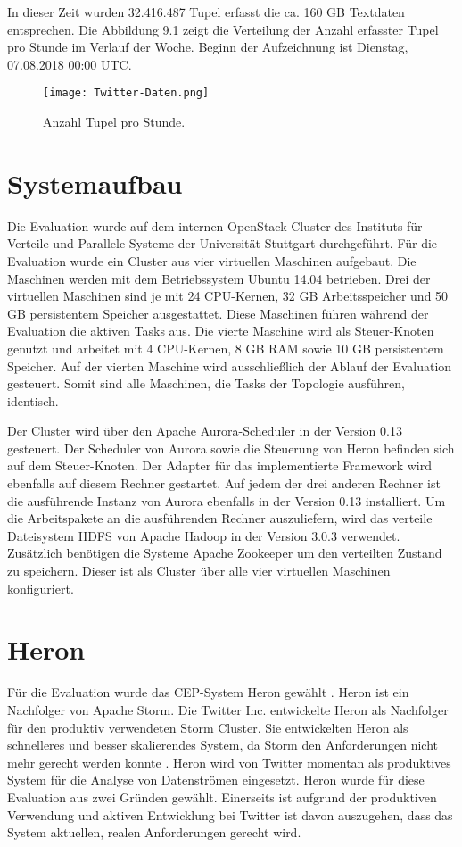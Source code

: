 In dieser Zeit wurden 32.416.487 Tupel erfasst die ca. 160 GB Textdaten entsprechen.
Die Abbildung 9.1 zeigt die Verteilung der Anzahl erfasster Tupel pro Stunde im Verlauf der Woche.
Beginn der Aufzeichnung ist Dienstag, 07.08.2018 00:00 UTC.


\begin{figure}
 \texttt{[image: Twitter-Daten.png]}
 \caption{Anzahl Tupel pro Stunde.}
\end{figure}

\section{Systemaufbau}
Die Evaluation wurde auf dem internen OpenStack-Cluster des Instituts für Verteile und Parallele Systeme der Universität Stuttgart durchgeführt.
Für die Evaluation wurde ein Cluster aus vier virtuellen Maschinen aufgebaut.
Die Maschinen werden mit dem Betriebssystem Ubuntu 14.04 betrieben.
Drei der virtuellen Maschinen sind je mit 24 CPU-Kernen, 32 GB Arbeitsspeicher und 50 GB persistentem Speicher ausgestattet.
Diese Maschinen führen während der Evaluation die aktiven Tasks aus.
Die vierte Maschine wird als Steuer-Knoten genutzt und arbeitet mit 4 CPU-Kernen, 8 GB RAM sowie 10 GB persistentem Speicher.
Auf der vierten Maschine wird ausschließlich der Ablauf der Evaluation gesteuert.
Somit sind alle Maschinen, die Tasks der Topologie ausführen, identisch.

Der Cluster wird über den Apache Aurora-Scheduler in der Version 0.13 gesteuert.
Der Scheduler von Aurora sowie die Steuerung von Heron befinden sich auf dem Steuer-Knoten.
Der Adapter für das implementierte Framework wird ebenfalls auf diesem Rechner gestartet.
Auf jedem der drei anderen Rechner ist die ausführende Instanz von Aurora ebenfalls in der Version 0.13 installiert.
Um die Arbeitspakete an die ausführenden Rechner auszuliefern, wird das verteile Dateisystem HDFS von Apache Hadoop in der Version 3.0.3 verwendet.
Zusätzlich benötigen die Systeme Apache Zookeeper um den verteilten Zustand zu speichern.
Dieser ist als Cluster über alle vier virtuellen Maschinen konfiguriert.

\section{Heron}
Für die Evaluation wurde das CEP-System Heron gewählt \cite{kulkarni_twitter_2015}.
Heron ist ein Nachfolger von Apache Storm.
Die Twitter Inc. entwickelte Heron als Nachfolger für den produktiv verwendeten Storm Cluster.
Sie entwickelten Heron als schnelleres und besser skalierendes System, da Storm den Anforderungen nicht mehr gerecht werden konnte \cite{kulkarni_twitter_2015}.
Heron wird von Twitter momentan als produktives System für die Analyse von Datenströmen eingesetzt.
Heron wurde für diese Evaluation aus zwei Gründen gewählt.
Einerseits ist aufgrund der produktiven Verwendung und aktiven Entwicklung bei Twitter ist davon auszugehen, dass das System aktuellen, realen Anforderungen gerecht wird.

